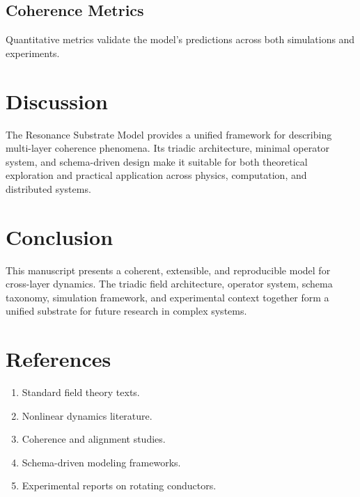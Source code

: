 \documentclass[12pt]{article}
\begin{document}
\subsection{Coherence Metrics}
Quantitative metrics validate the model's predictions across both simulations and experiments.

\section{Discussion}

The Resonance Substrate Model provides a unified framework for describing multi-layer coherence phenomena. Its triadic architecture, minimal operator system, and schema-driven design make it suitable for both theoretical exploration and practical application across physics, computation, and distributed systems.

\section{Conclusion}

This manuscript presents a coherent, extensible, and reproducible model for cross-layer dynamics. The triadic field architecture, operator system, schema taxonomy, simulation framework, and experimental context together form a unified substrate for future research in complex systems.

\section*{References}
\begin{enumerate}
    \item Standard field theory texts.
    \item Nonlinear dynamics literature.
    \item Coherence and alignment studies.
    \item Schema-driven modeling frameworks.
    \item Experimental reports on rotating conductors.
\end{enumerate}
\end{document}
